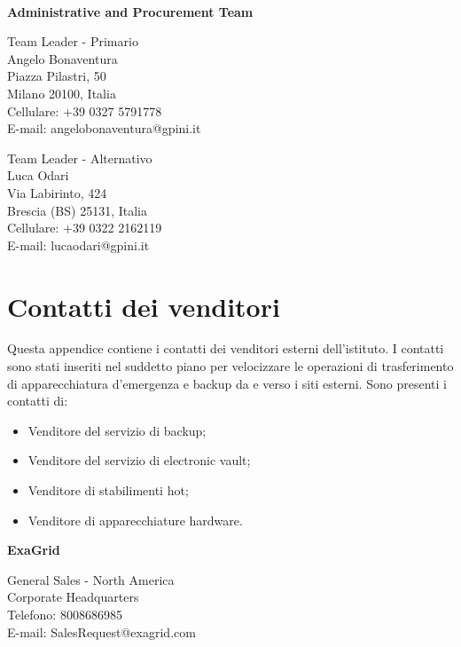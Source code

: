 \documentclass[12pt, a4paper, titlepage]{report}
\newcommand\tab[1][1cm]{\hspace*{#1}}
\begin{document}
	\newpage
	\centerline{\textbf{\\Administrative and Procurement Team}}
	\begin{paracol}{2}
		\setlength{\columnsep}{5em}
		\begin{leftcolumn}
			\begin{adjustwidth}{0.5cm}{}
				Team Leader - Primario \\
				Angelo Bonaventura \\
				Piazza Pilastri, 50\\ 
				Milano 20100, Italia  
				\\Cellulare:  +39 0327 5791778 \\
				E-mail:  angelobonaventura@gpini.it 
			\end{adjustwidth}
		\end{leftcolumn}
		\begin{rightcolumn}
			\begin{adjustwidth}{0.5cm}{}
				Team Leader - Alternativo \\
				Luca Odari\\
				Via Labirinto, 424\\ 
				Brescia (BS) 25131, Italia \\
				Cellulare:  +39 0322 2162119 \\
				E-mail: lucaodari@gpini.it 
			\end{adjustwidth}
		\end{rightcolumn}
	\end{paracol}
	
	\chapter{Contatti dei venditori} \label{recapitiVendor}
	
	Questa appendice contiene i contatti dei venditori esterni dell'istituto. I contatti sono stati inseriti nel suddetto piano per velocizzare le operazioni di trasferimento di apparecchiatura d'emergenza e backup da e verso i siti esterni. Sono presenti i contatti di:
	\begin{itemize}
		\item Venditore del servizio di backup;
		\item Venditore del servizio di electronic vault;
		\item Venditore di stabilimenti hot;
		\item Venditore di apparecchiature hardware.
	\end{itemize}
	
	\textbf{ExaGrid}
	\begin{adjustwidth}{0.5cm}{}
		\tab General Sales - North America \\
		\tab Corporate Headquarters \\
		\tab Telefono: 8008686985 \\
		\tab E-mail: SalesRequest@exagrid.com
	\end{adjustwidth}
	
\end{document}
